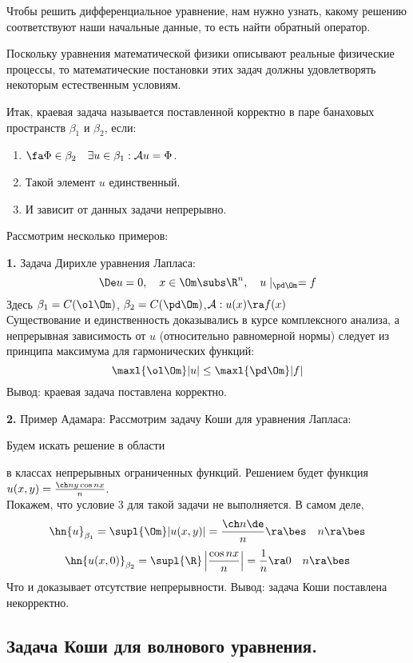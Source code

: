 \documentclass[a4paper,draft]{article}
\begin{document}
Чтобы решить дифференциальное уравнение, нам нужно узнать, какому
решению соответствуют наши начальные данные, то есть найти
обратный оператор.

Поскольку уравнения математической физики описывают реальные
физические процессы, то математические постановки этих задач
должны удовлетворять некоторым естественным условиям.

Итак, краевая задача называется поставленной корректно в паре
банаховых пространств $\beta_1$ и $\beta_2$, если:
\begin{enumerate}
\item  $\fa \Phi\in\beta_2\quad \exists u\in\beta_1 :
\mathcal{A}u=\Phi$.
\item Такой элемент $u$ единственный.
\item И зависит от данных задачи непрерывно.
\end{enumerate}

Рассмотрим несколько примеров:

\textbf{1.} Задача Дирихле уравнения Лапласа:
$$\De u=0,\quad x\in\Om\subs\R^n,\quad u\mid_{\pd\Om}=f $$
Здесь $\beta_1=C(\ol\Om)$,
$\beta_2=C(\pd\Om)$,$\mathcal{A}:u(x)\ra f(x)$\\
Существование и единственность доказывались в курсе комплексного
анализа, а непрерывная зависимость от $u$ (относительно
равномерной нормы) следует из принципа максимума для гармонических
функций:
$$
 \maxl{\ol\Om} |u|\le \maxl{\pd\Om} |f|
$$
Вывод: краевая задача поставлена корректно.

\textbf{2.} Пример Адамара: Рассмотрим задачу Коши для уравнения
Лапласа:

Будем искать решение в области

 в классах непрерывных ограниченных функций.
Решением будет функция $ u(x,y)=\frac{\ch ny \cos nx}n$.\\
Покажем, что условие 3 для такой задачи не выполняется. В самом
деле,
$$
\hn{u}_{\beta_1}= \supl{\Om} |u(x,y)|=\frac{\ch n\de}n
\ra \bes \quad n\ra\bes
$$
$$
\hn{u(x,0)}_{\beta_2}= \supl{\R} \left|\frac{\cos
nx}n\right|=\frac1n\ra0\quad n\ra\bes
$$
Что и доказывает отсутствие непрерывности. Вывод: задача Коши
поставлена некорректно.

\subsection {Задача Коши для волнового уравнения.}
\end{document}
